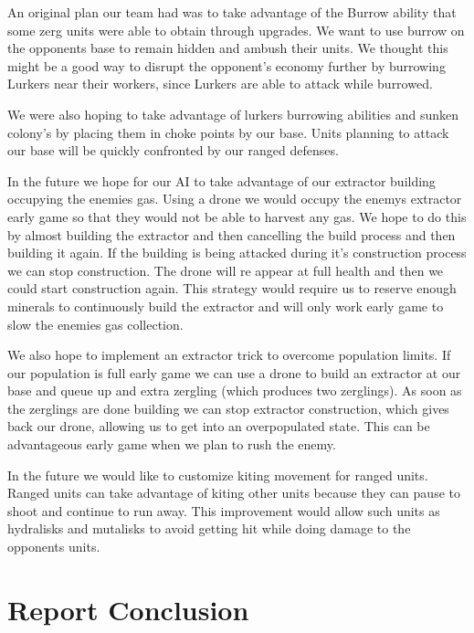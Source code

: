 \documentclass{article}
\begin{document}
An original plan our team had was to take advantage of the Burrow ability that some zerg units were able to obtain through upgrades. We want to use burrow on the opponents base to remain hidden and ambush their units. We thought this might be a good way to disrupt the opponent's economy further by burrowing Lurkers near their workers, since Lurkers are able to attack while burrowed.

We were also hoping to take advantage of lurkers burrowing abilities and sunken colony’s by placing them in choke points by our base. Units planning to attack our base will be quickly confronted by our ranged defenses.

In the future we hope for our AI to take advantage of our extractor building occupying the enemies gas. Using a drone we would occupy the enemys extractor early game so that they would not be able to harvest any gas. We hope to do this by almost building the extractor and then cancelling the build process and then building it again. If the building is being attacked during it’s construction process we can stop construction. The drone will re appear at full health and then we could start construction again. This strategy would require us to reserve enough minerals to continuously build the extractor and will only work early game to slow the enemies gas collection. 

We also hope to implement an extractor trick to overcome population limits. If our population is full early game we can use a drone to build an extractor at our base and queue up and extra zergling (which produces two zerglings). As soon as the zerglings are done building we can stop extractor construction, which gives back our drone, allowing us to get into an overpopulated state. This can be advantageous early game when we plan to rush the enemy.

In the future we would like to customize kiting movement for ranged units. Ranged units can take advantage of kiting other units because they can pause to shoot and continue to run away. This improvement would allow such units as hydralisks and mutalisks to avoid getting hit while doing damage to the opponents units. 

\section{Report Conclusion}
\end{document}
